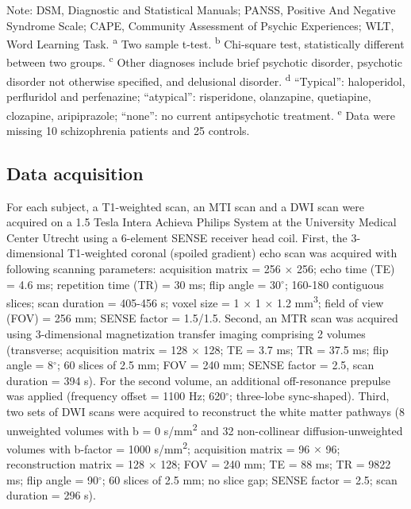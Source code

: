 \begin{refsection}
\begin{table}
\begin{flushleft}
\footnotesize
Note: DSM, Diagnostic and Statistical Manuals; PANSS, Positive And Negative Syndrome Scale; CAPE, Community Assessment of Psychic Experiences; WLT, Word Learning Task. \textsuperscript{a} Two sample t-test. \textsuperscript{b} Chi-square test, statistically different between two groups.
\textsuperscript{c} Other diagnoses include brief psychotic disorder, psychotic disorder not otherwise specified, and delusional disorder. \textsuperscript{d} “Typical”: haloperidol, perfluridol and perfenazine; “atypical”: risperidone, olanzapine, quetiapine, clozapine, aripiprazole; “none”: no current antipsychotic treatment. \textsuperscript{e} Data were missing 10 schizophrenia patients and 25 controls.
\end{flushleft}
\label{mtrtable1}
\end{table}

\subsection*{Data acquisition}
For each subject, a T1-weighted scan, an MTI scan and a DWI scan were acquired on a 1.5 Tesla Intera Achieva Philips System at the University Medical Center Utrecht using a 6-element SENSE receiver head coil. First, the 3-dimensional T1-weighted coronal (spoiled gradient) echo scan was acquired with following scanning parameters: acquisition matrix = 256 $\times$ 256; echo time (TE) = 4.6 ms; repetition time (TR) = 30 ms; flip angle = 30$^{\circ}$; 160-180 contiguous slices; scan duration = 405-456 s; voxel size = 1 $\times$ 1 $\times$ 1.2 mm\textsuperscript{3}; field of view (FOV) = 256 mm; SENSE factor = 1.5/1.5. Second, an MTR scan was acquired using 3-dimensional magnetization transfer imaging comprising 2 volumes (transverse; acquisition matrix = 128 $\times$ 128; TE = 3.7 ms; TR = 37.5 ms; flip angle = 8$^{\circ}$; 60 slices of 2.5 mm; FOV = 240 mm; SENSE factor = 2.5, scan duration = 394 s). For the second volume, an additional off-resonance prepulse was applied (frequency offset = 1100 Hz; 620$^{\circ}$; three-lobe sync-shaped). Third, two sets of DWI scans were acquired to reconstruct the white matter pathways (8 unweighted volumes with b = 0 s/mm\textsuperscript{2} and 32 non-collinear diffusion-unweighted volumes with b-factor = 1000 s/mm\textsuperscript{2}; acquisition matrix = 96 $\times$ 96; reconstruction matrix = 128 $\times$ 128; FOV = 240 mm; TE = 88 ms; TR = 9822 ms; flip angle = 90$^{\circ}$; 60 slices of 2.5 mm; no slice gap; SENSE factor = 2.5; scan duration = 296 s).


\end{refsection}

